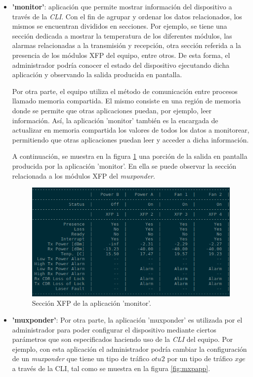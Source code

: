 \begin{itemize}
	\item \textbf{'monitor'}: aplicación que permite mostrar información del dispositivo a través de la \textit{CLI}. Con el fin de agrupar y ordenar los datos relacionados, los mismos se encuentran divididos en secciones. Por ejemplo, se tiene una sección dedicada a mostrar la temperatura de los diferentes módulos, las alarmas relacionadas a la transmisión y recepción, otra sección referida a la presencia de los módulos XFP del equipo, entre otros. De esta forma, el administrador podría conocer el estado del dispositivo ejecutando dicha aplicación y observando la salida producida en pantalla.
	
	Por otra parte, el equipo utiliza el método de comunicación entre procesos llamado memoria compartida. El mismo consiste en una región de memoria donde se permite que otras aplicaciones puedan, por ejemplo, leer información. Así, la aplicación 'monitor' también es la encargada de actualizar en memoria compartida los valores de todos los datos a monitorear, permitiendo que otras aplicaciones puedan leer y acceder a dicha información.
	
	A continuación, se muestra en la figura \ref{fig:monitor} una porción de la salida en pantalla producida por la aplicación 'monitor'. En ella se puede observar la sección relacionada a los módulos XFP del \textit{muxponder}.
	
	\begin{figure}[H]
		\centering
		\includegraphics[scale=0.77]{Figures/monitorapp.png}
		\caption{Sección XFP de la aplicación ’monitor’.}
		\label{fig:monitor}
	  \end{figure}

	\item \textbf{'muxponder'}: Por otra parte, la aplicación 'muxponder' es utilizada por el administrador para poder configurar el dispositivo mediante ciertos parámetros que son especificados haciendo uso de la \textit{CLI} del equipo. Por ejemplo, con esta aplicación el administrador podría cambiar la configuración de un \textit{muxponder} que tiene un tipo de tráfico $otu2$ por un tipo de tráfico $xge$ a través de la CLI, tal como se muestra en la figura \ref{fig:mxpapp}.


\end{itemize}
